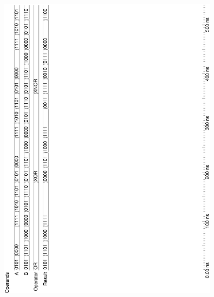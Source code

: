 \documentclass[10pt,a4paper]{report}
\begin{document}
\begin{figure}
\includegraphics[scale=0.5,angle=-90]{graphs/alu_4bit_test2p1.ps}

\end{figure}
\end{document}
